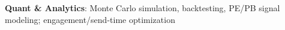 \item \textbf{Quant \& Analytics}: Monte Carlo simulation, backtesting, PE/PB signal modeling; engagement/send-time optimization
